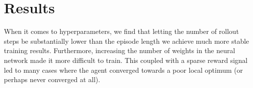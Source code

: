 \chapter{Results}
\label{cha:results}

% 
% 

When it comes to hyperparameters, we find that letting the number of rollout steps be substantially lower than the episode length we achieve much more stable training results.
Furthermore, increasing the number of weights in the neural network made it more difficult to train.
This coupled with a sparse reward signal led to many cases where the agent converged towards a poor local optimum (or perhaps never converged at all).
